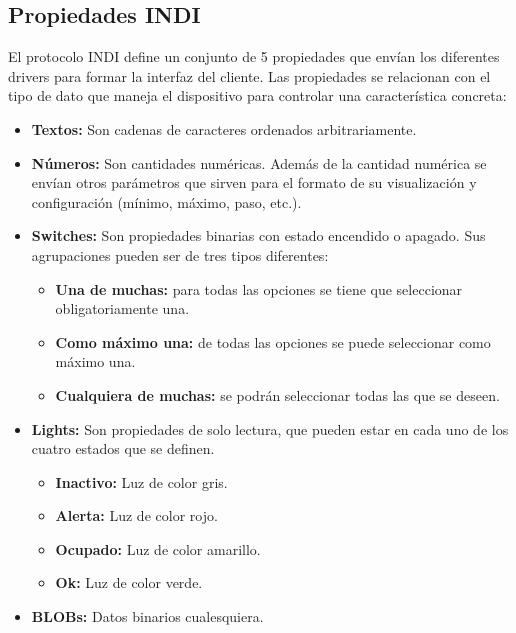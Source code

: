 \subsection{Propiedades INDI}

El protocolo INDI define un conjunto de 5 propiedades que envían los diferentes drivers para formar la interfaz del cliente. Las propiedades se relacionan con el tipo de dato que maneja el dispositivo para controlar una característica concreta:

\begin{itemize}
	\item \textbf{Textos:} Son cadenas de caracteres ordenados arbitrariamente.
	
	\item \textbf{Números:} Son cantidades numéricas. Además de la cantidad numérica se envían otros parámetros que sirven para el formato de su visualización y configuración (mínimo, máximo, paso, etc.).
	
	\item \textbf{Switches:} Son propiedades binarias con estado encendido o apagado. Sus agrupaciones pueden ser de tres tipos diferentes:
	
	\begin{itemize}
		\item \textbf{Una de muchas:} para todas las opciones se tiene que seleccionar
		obligatoriamente una.
		
		\item \textbf{Como máximo una:} de todas las opciones se puede seleccionar
		como máximo una.
		
		\item \textbf{Cualquiera de muchas:} se podrán seleccionar todas las que se
		deseen.
		
	\end{itemize}	
	
	\item \textbf{Lights:} Son propiedades de solo lectura, que pueden estar en cada uno de los cuatro
	estados que se definen.
	
	\begin{itemize}
		\item \textbf{Inactivo:} Luz de color gris.
		\item \textbf{Alerta:} Luz de color rojo.
		\item \textbf{Ocupado:} Luz de color amarillo.
		\item \textbf{Ok:} Luz de color verde.
	\end{itemize}
		
	\item \textbf{BLOBs:} Datos binarios cualesquiera.
\end{itemize}


